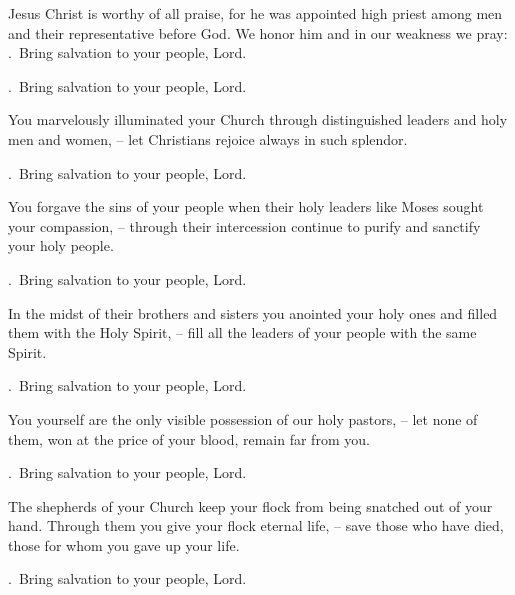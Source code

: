 \lettrine[loversize=0.15,lines=2]{J}{}esus Christ is worthy of all praise, for he was appointed high priest among men and their representative before God. We honor him and in our weakness we pray: \Rbar.~Bring salvation to your people, Lord.
\par \Rbar.~Bring salvation to your people, Lord.

You marvelously illuminated your Church through distinguished leaders and holy men and women,
– let Christians rejoice always in such splendor.
\par \Rbar.~Bring salvation to your people, Lord.

You forgave the sins of your people when their holy leaders like Moses sought your compassion,
– through their intercession continue to purify and sanctify your holy people.
\par \Rbar.~Bring salvation to your people, Lord.

In the midst of their brothers and sisters you anointed your holy ones and filled them with the Holy Spirit,
– fill all the leaders of your people with the same Spirit.
\par \Rbar.~Bring salvation to your people, Lord.

You yourself are the only visible possession of our holy pastors,
– let none of them, won at the price of your blood, remain far from you.
\par \Rbar.~Bring salvation to your people, Lord.

The shepherds of your Church keep your flock from being snatched out of your hand. Through them you give your flock eternal life,
– save those who have died, those for whom you gave up your life.
\par \Rbar.~Bring salvation to your people, Lord.
